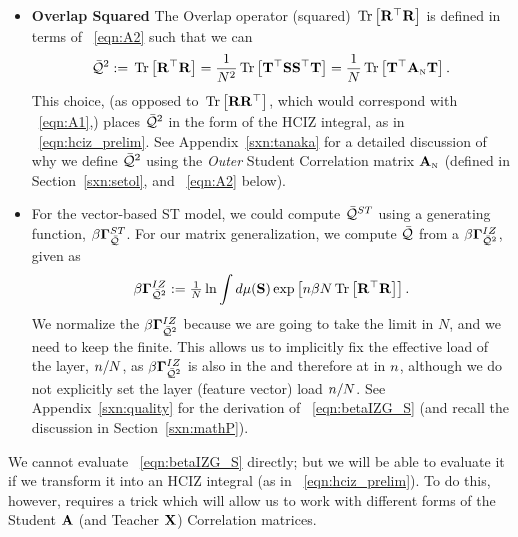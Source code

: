 \begin{itemize}
\item
 \textbf{Overlap Squared}
 The Overlap operator (squared)  $\mbox{}\operatorname{Tr}\left[\mathbf{R}^{\top}\mathbf{R}\right]$ is defined  in terms of \EQN~\ref{eqn:A2} such
 that we can 
\begin{align}
  \label{eqn:TraceR2withA2}
  \bar{\mathcal{Q}}^{2} :=\mbox{}\operatorname{Tr}\left[\mathbf{R}^{\top}\mathbf{R}\right]
  =\frac{1}{N^{2}}\mbox{}\operatorname{Tr}\left[{\mathbf{T}}^{\top}{\mathbf{S}}{\mathbf{S}}^{\top}{\mathbf{T}}\right]
  =\frac{1}{N}\mbox{}\operatorname{Tr}\left[{\mathbf{T}}^{\top}{\mathbf{A}}_{\text{\tiny N}}{\mathbf{T}}\right]  .
\end{align}
This choice, (as opposed to $\mbox{}\operatorname{Tr}\left[\mathbf{R}\mathbf{R}^{\top}\right]$, which would correspond with \EQN~\ref{eqn:A1},) places $\bar{\mathcal{Q}}^{2}$ in the form of the HCIZ integral, as in \EQN~\ref{eqn:hciz_prelim}.
See Appendix~\ref{sxn:tanaka} for a detailed discussion of why we define $\bar{\mathcal{Q}}^{2}$ using the \emph{Outer} Student Correlation matrix ${\mathbf{A}}_{\text{\tiny N}}$ (defined in Section~\ref{sxn:setol}, and  \EQN~\ref{eqn:A2} below).
\item
 \textbf{\GeneratingFunction}
For the vector-based ST model, we could compute $\bar{\mathcal{Q}}^{ST}$ using a generating function, $\beta\mathbf{\Gamma}^{ST}_{\bar{\mathcal{Q}}}$.
For our matrix generalization, we compute $\bar{\mathcal{Q}}$ from a \emph{\LayerQualitySquared \GeneratingFunction} $\beta\mathbf{\Gamma}^{IZ}_{\bar{\mathcal{Q}}^{2}}$, given as
\begin{align}
  \label{eqn:betaIZG_S}
  \beta\mathbf{\Gamma}^{IZ}_{\bar{\mathcal{Q}}^{2}}:=  \tfrac{1}{N}\ln \int d\mu({\mathbf{S}}) \exp\left[n\beta N\mbox{}\operatorname{Tr}\left[\mathbf{R}^{\top}\mathbf{R}\right]\right] .
\end{align}
We normalize the $\beta\mathbf{\Gamma}^{IZ}_{\bar{\mathcal{Q}}^{2}}$ because we are going to take the \LargeN limit in $N$, and we need to keep the \LayerQuality finite.  This allows us to implicitly fix the effective load of the layer, $n/N$, as $\beta\mathbf{\Gamma}^{IZ}_{\bar{\mathcal{Q}}^{2}}$ is also in the \ThermodynamicLimit and therefore at \LargeN in $n$, although we do not explicitly set the layer (feature vector) load $n/N$.
See Appendix~\ref{sxn:quality} for the derivation of \EQN~\ref{eqn:betaIZG_S} (and recall the discussion in Section~\ref{sxn:mathP}). 
\end{itemize}

We cannot evaluate \EQN~\ref{eqn:betaIZG_S} directly; but we will be able to evaluate it if we transform it into an HCIZ integral (as in \EQN~\ref{eqn:hciz_prelim}). To do this, however, requires a trick which will allow us to work with different forms of the Student $\mathbf{A}$ (and Teacher $\mathbf{X}$) Correlation matrices.

